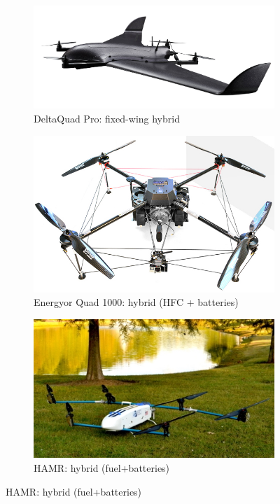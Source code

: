 \begin{figure}[htb!]
  \begin{subfigure}[t]{.32\textwidth}\centering
    \includegraphics[width=\linewidth]{./img/jpg/uav-deltaQuadPro-hybrid.jpg}
    \caption{DeltaQuad Pro: fixed-wing hybrid~\cite{deltaQuadDrone}}
    \label{fig:uav-fixed-wing-hybrid}
  \end{subfigure}\hfill
  \begin{subfigure}[t]{.32\textwidth}\centering
    \includegraphics[width=\linewidth]{./img/jpg/uav-energyorQuad1000-hfc.jpg}
    \caption{Energyor Quad 1000: hybrid (HFC + batteries)~\cite{energyorDrone}}
    \label{fig:uav-energyor-hfc}
  \end{subfigure}\hfill
  \begin{subfigure}[t]{.32\textwidth}\centering
    \includegraphics[width=\linewidth]{./img/jpg/uav-HAMR-FuelElectric.jpg}
    \caption{HAMR: hybrid (fuel+batteries)~\cite{hamrDrone}}
    \label{fig:uav-hamr-fuel}
  \end{subfigure}


\end{figure}
